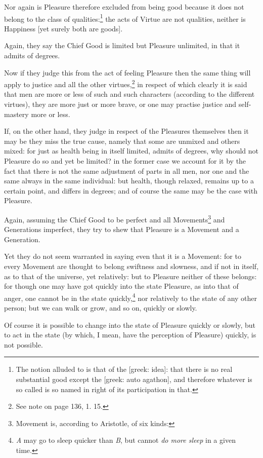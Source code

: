 Nor again is Pleasure therefore excluded from being good because it does not
belong to the class of qualities:\footnote{The notion alluded to is that of the [greek: idea]: that there is no real
substantial good except the [greek: auto agathon], and therefore whatever is so
called is so named in right of its participation in that.}
the acts of Virtue are not qualities, neither is Happiness [yet surely both are
goods].

Again, they say the Chief Good is limited but Pleasure unlimited, in that it
admits of degrees.

Now if they judge this from the act of feeling Pleasure then the same thing
will apply to justice and all the other virtues,\footnote{See note on page 136, 1. 15.}
in respect of which clearly it is said that men are more or less of such and
such characters (according to the different virtues), they are more just or
more brave, or one may practise justice and self-mastery more or less.

If, on the other hand, they judge in respect of the Pleasures themselves then
it may be they miss the true cause, namely that some are unmixed and others
mixed: for just as health being in itself limited, admits of degrees, why
should not Pleasure do so and yet be limited? in the former case we account for
it by the fact that there is not the same adjustment of parts in all men, nor
one and the same always in the same individual: but health, though relaxed,
remains up to a certain point, and differs in degrees; and of course the same
may be the case with Pleasure.

Again, assuming the Chief Good to be perfect and all
Movements\footnote{Movement is, according to Aristotle, of six kinds:}
and Generations imperfect, they try to shew that Pleasure is a Movement and a
Generation.

Yet they do not seem warranted in saying even that it is a Movement: for to
every Movement are thought to belong swiftness and slowness, and if not in
itself, as to that of the universe, yet relatively: but to Pleasure neither of
these belongs: for though one may have got quickly into the state Pleasure, as
into that of anger, one cannot be in the state quickly,\footnote{\emph{A} may go to sleep quicker than \emph{B}, but cannot \emph{do more sleep}
in a given time.}
nor relatively to the state of any other person; but we can walk or grow, and
so on, quickly or slowly.

Of course it is possible to change into the state of Pleasure quickly or
slowly, but to act in the state (by which, I mean, have the perception of
Pleasure) quickly, is not possible.

